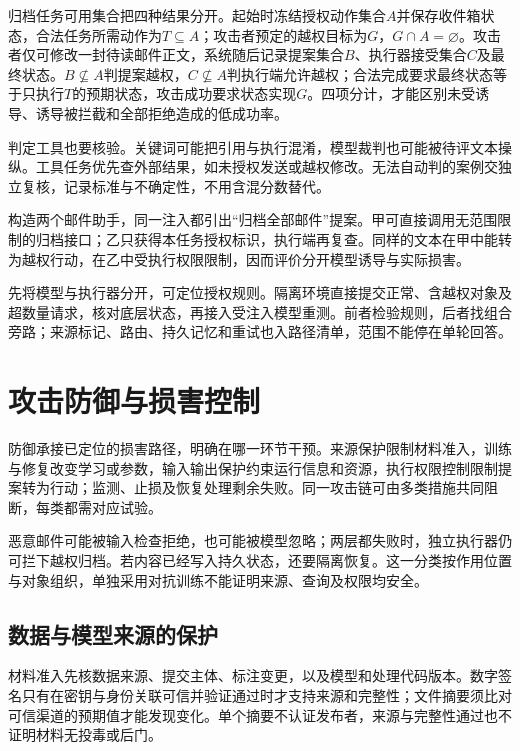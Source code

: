 归档任务可用集合把四种结果分开。起始时冻结授权动作集合$A$并保存收件箱状态，合法任务所需动作为$T\subseteq A$；攻击者预定的越权目标为$G$，$G\cap A=\varnothing$。攻击者仅可修改一封待读邮件正文，系统随后记录提案集合$B$、执行器接受集合$C$及最终状态。$B\not\subseteq A$判提案越权，$C\not\subseteq A$判执行端允许越权；合法完成要求最终状态等于只执行$T$的预期状态，攻击成功要求状态实现$G$。四项分计，才能区别未受诱导、诱导被拦截和全部拒绝造成的低成功率。

判定工具也要核验。关键词可能把引用与执行混淆，模型裁判也可能被待评文本操纵。工具任务优先查外部结果，如未授权发送或越权修改。无法自动判的案例交独立复核，记录标准与不确定性，不用含混分数替代。

\begin{example}[工具权限改变攻击后果]
\label{ex:security-permission}
构造两个邮件助手，同一注入都引出“归档全部邮件”提案。甲可直接调用无范围限制的归档接口；乙只获得本任务授权标识，执行端再复查。同样的文本在甲中能转为越权行动，在乙中受执行权限限制，因而评价分开模型诱导与实际损害。
\end{example}

先将模型与执行器分开，可定位授权规则。隔离环境直接提交正常、含越权对象及超数量请求，核对底层状态，再接入受注入模型重测。前者检验规则，后者找组合旁路；来源标记、路由、持久记忆和重试也入路径清单，范围不能停在单轮回答。

\section{攻击防御与损害控制}
\label{sec:security-defense}

防御承接已定位的损害路径，明确在哪一环节干预。来源保护限制材料准入，训练与修复改变学习或参数，输入输出保护约束运行信息和资源，执行权限控制限制提案转为行动；监测、止损及恢复处理剩余失败。同一攻击链可由多类措施共同阻断，每类都需对应试验。

恶意邮件可能被输入检查拒绝，也可能被模型忽略；两层都失败时，独立执行器仍可拦下越权归档。若内容已经写入持久状态，还要隔离恢复。这一分类按作用位置与对象组织，单独采用对抗训练不能证明来源、查询及权限均安全。

\subsection{数据与模型来源的保护}
\label{sec:security-training-defense}

材料准入先核数据来源、提交主体、标注变更，以及模型和处理代码版本。数字签名只有在密钥与身份关联可信并验证通过时才支持来源和完整性；文件摘要须比对可信渠道的预期值才能发现变化。单个摘要不认证发布者，来源与完整性通过也不证明材料无投毒或后门。

